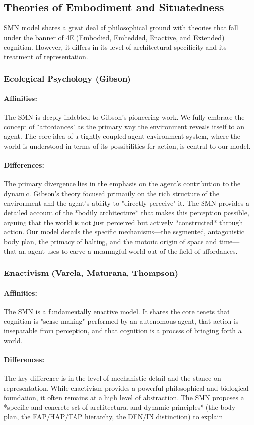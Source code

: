 \n\subsection{Theories of Embodiment and Situatedness}\n\label{subsec:comparison_embodiment}\nThe SMN model shares a great deal of philosophical ground with theories that fall under the banner of 4E (Embodied, Embedded, Enactive, and Extended) cognition. However, it differs in its level of architectural specificity and its treatment of representation.\n\n\subsubsection{Ecological Psychology (Gibson)}\n\label{ssubsec:ecological}\n\paragraph{Affinities:} The SMN is deeply indebted to Gibson's pioneering work. We fully embrace the concept of "affordances" as the primary way the environment reveals itself to an agent. The core idea of a tightly coupled agent-environment system, where the world is understood in terms of its possibilities for action, is central to our model.\n\n\paragraph{Differences:} The primary divergence lies in the emphasis on the agent's contribution to the dynamic. Gibson's theory focused primarily on the rich structure of the environment and the agent's ability to "directly perceive" it. The SMN provides a detailed account of the *bodily architecture* that makes this perception possible, arguing that the world is not just perceived but actively *constructed* through action. Our model details the specific mechanisms—the segmented, antagonistic body plan, the primacy of halting, and the motoric origin of space and time—that an agent uses to carve a meaningful world out of the field of affordances.\n\n\subsubsection{Enactivism (Varela, Maturana, Thompson)}\n\label{ssubsec:enactivism}\n\paragraph{Affinities:} The SMN is a fundamentally enactive model. It shares the core tenets that cognition is "sense-making" performed by an autonomous agent, that action is inseparable from perception, and that cognition is a process of bringing forth a world.\n\n\paragraph{Differences:} The key difference is in the level of mechanistic detail and the stance on representation. While enactivism provides a powerful philosophical and biological foundation, it often remains at a high level of abstraction. The SMN proposes a *specific and concrete set of architectural and dynamic principles* (the body plan, the FAP/HAP/TAP hierarchy, the DFN/IN distinction) to explain 